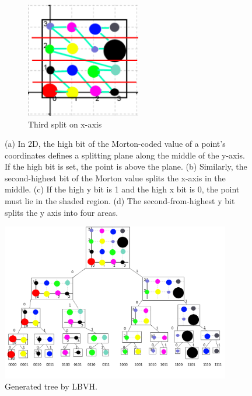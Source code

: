 \documentclass[11pt,a4paper]{article}
\begin{document}
\begin{figure}[H]
\begin{subfigure}[b]{0.475\textwidth}
     \end{subfigure}
        \captionsetup{justification=centering,margin=2cm}
             \hfill
     \begin{subfigure}[b]{0.475\textwidth}
         \centering
         \captionsetup{justification=centering}
         \includegraphics[width=5cm]{images/example_lbvh/03.png}
         \caption{Third split on x-axis}
         \label{fig:pi_18000}
     \end{subfigure}
        \captionsetup{justification=centering,margin=2cm}

        \caption{(a) In 2D, the high bit of the Morton-coded value of a point’s coordinates defines a splitting plane along the middle of the y-axis. If the high bit is set, the point is above the plane. (b) Similarly, the second-highest bit of the Morton value splits the x-axis in the middle. (c) If the high y bit is 1 and the high x bit is 0, the point must lie in the shaded region. (d) The second-from-highest y bit splits the y axis into four areas. }
        \label{fig:three graphs}
\end{figure}



\begin{figure}[h]	
     \centering
     \captionsetup{justification=centering,margin=2cm}
     \includegraphics[width=10cm]{images/example_lbvh/tree.png}
     \caption{Generated tree by LBVH.}
     \label{fig:dice}
\end{figure}
\end{document}
